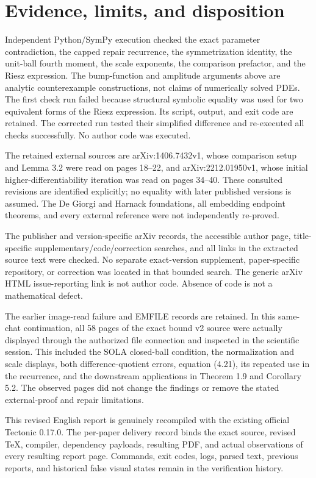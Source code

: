 \documentclass[10pt]{article}
\begin{document}
\section*{Evidence, limits, and disposition}
Independent Python/SymPy execution checked the exact parameter contradiction, the capped repair recurrence, the symmetrization identity, the unit-ball fourth moment, the scale exponents, the comparison prefactor, and the Riesz expression. The bump-function and amplitude arguments above are analytic counterexample constructions, not claims of numerically solved PDEs. The first check run failed because structural symbolic equality was used for two equivalent forms of the Riesz expression. Its script, output, and exit code are retained. The corrected run tested their simplified difference and re-executed all checks successfully. No author code was executed.\par
The retained external sources are arXiv:1406.7432v1, whose comparison setup and Lemma 3.2 were read on pages 18–22, and arXiv:2212.01950v1, whose initial higher-differentiability iteration was read on pages 34–40. These consulted revisions are identified explicitly; no equality with later published versions is assumed. The De Giorgi and Harnack foundations, all embedding endpoint theorems, and every external reference were not independently re-proved.\par
The publisher and version-specific arXiv records, the accessible author page, title-specific supplementary/code/correction searches, and all links in the extracted source text were checked. No separate exact-version supplement, paper-specific repository, or correction was located in that bounded search. The generic arXiv HTML issue-reporting link is not author code. Absence of code is not a mathematical defect.\par
The earlier image-read failure and EMFILE records are retained. In this same-chat continuation, all 58 pages of the exact bound v2 source were actually displayed through the authorized file connection and inspected in the scientific session. This included the SOLA closed-ball condition, the normalization and scale displays, both difference-quotient errors, equation (4.21), its repeated use in the recurrence, and the downstream applications in Theorem 1.9 and Corollary 5.2. The observed pages did not change the findings or remove the stated external-proof and repair limitations.\par
This revised English report is genuinely recompiled with the existing official Tectonic 0.17.0. The per-paper delivery record binds the exact source, revised TeX, compiler, dependency payloads, resulting PDF, and actual observations of every resulting report page. Commands, exit codes, logs, parsed text, previous reports, and historical false visual states remain in the verification history.\par
\end{document}
